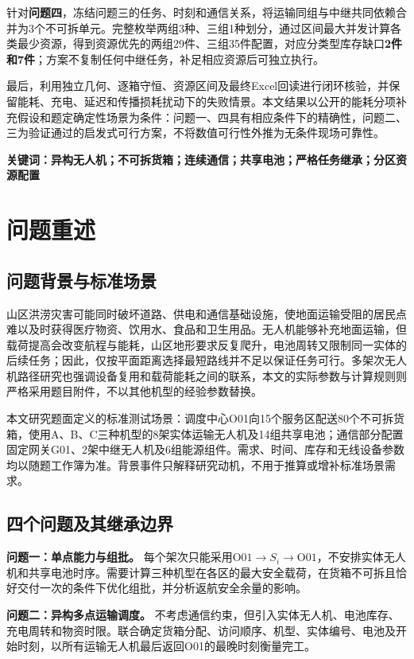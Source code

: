 \documentclass[a4paper]{my_paper}%
\numberwithin{equation}{section}
\theoremstyle{definition}
\begin{document}
针对\textbf{问题四}，冻结问题三的任务、时刻和通信关系，将运输同组与中继共同依赖合并为3个不可拆单元。完整枚举两组3种、三组1种划分，通过区间最大并发计算各类最少资源，得到资源优先的两组29件、三组35件配置，对应分类型库存缺口\textbf{2件和7件}；方案不复制任何中继任务，补足相应资源后可独立执行。

最后，利用独立几何、逐箱守恒、资源区间及最终Excel回读进行闭环核验，并保留能耗、充电、延迟和传播损耗扰动下的失败情景。本文结果以公开的能耗分项补充假设和题定确定性场景为条件：问题一、四具有相应条件下的精确性，问题二、三为验证通过的启发式可行方案，不将数值可行性外推为无条件现场可靠性。

\vspace{.8em}
\noindent\textbf{关键词：异构无人机；不可拆货箱；连续通信；共享电池；严格任务继承；分区资源配置}

\clearpage
\tableofcontents
\clearpage

\section{问题重述}
\subsection{问题背景与标准场景}
山区洪涝灾害可能同时破坏道路、供电和通信基础设施，使地面运输受阻的居民点难以及时获得医疗物资、饮用水、食品和卫生用品。无人机能够补充地面运输，但载荷提高会改变航程与能耗，山区地形要求反复爬升，电池周转又限制同一实体的后续任务；因此，仅按平面距离选择最短路线并不足以保证任务可行。多架次无人机路径研究也强调设备复用和载荷能耗之间的联系\cite{dorling}，本文的实际参数与计算规则则严格采用题目附件，不以其他机型的经验参数替换。

本文研究题面定义的标准测试场景\cite{problem}：调度中心O01向15个服务区配送80个不可拆货箱，使用A、B、C三种机型的8架实体运输无人机及14组共享电池；通信部分配置固定网关G01、2架中继无人机及6组能源组件。需求、时间、库存和无线设备参数均以随题工作簿为准\cite{data}。背景事件只解释研究动机，不用于推算或增补标准场景需求。

\subsection{四个问题及其继承边界}
\textbf{问题一：单点能力与组批。} 每个架次只能采用$\mathrm{O01}\to S_i\to\mathrm{O01}$，不安排实体无人机和共享电池时序。需要计算三种机型在各区的最大安全载荷，在货箱不可拆且恰好交付一次的条件下优化组批，并分析返航安全余量的影响。

\textbf{问题二：异构多点运输调度。} 不考虑通信约束，但引入实体无人机、电池库存、充电周转和物资时限。联合确定货箱分配、访问顺序、机型、实体编号、电池及开始时刻，以所有运输无人机最后返回O01的最晚时刻衡量完工。
\end{document}

